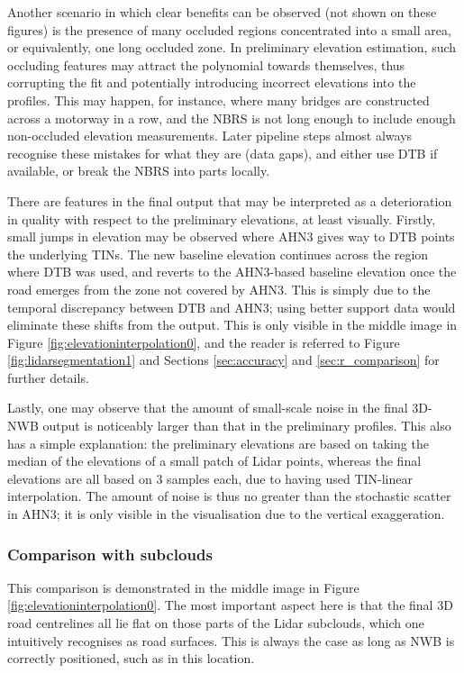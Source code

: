 Another scenario in which clear benefits can be observed (not shown on these figures) is the presence of many occluded regions concentrated into a small area, or equivalently, one long occluded zone. In preliminary elevation estimation, such occluding features may attract the polynomial towards themselves, thus corrupting the fit and potentially introducing incorrect elevations into the profiles. This may happen, for instance, where many bridges are constructed across a motorway in a row, and the NBRS is not long enough to include enough non-occluded elevation measurements. Later pipeline steps almost always recognise these mistakes for what they are (data gaps), and either use DTB if available, or break the NBRS into parts locally.

There are features in the final output that may be interpreted as a deterioration in quality with respect to the preliminary elevations, at least visually. Firstly, small jumps in elevation may be observed where AHN3 gives way to DTB points the underlying TINs. The new baseline elevation continues across the region where DTB was used, and reverts to the AHN3-based baseline elevation once the road emerges from the zone not covered by AHN3. This is simply due to the temporal discrepancy between DTB and AHN3; using better support data would eliminate these shifts from the output. This is only visible in the middle image in Figure \ref{fig:elevationinterpolation0}, and the reader is referred to Figure \ref{fig:lidarsegmentation1} and Sections \ref{sec:accuracy} and \ref{sec:r_comparison} for further details.

Lastly, one may observe that the amount of small-scale noise in the final 3D-NWB output is noticeably larger than that in the preliminary profiles. This also has a simple explanation: the preliminary elevations are based on taking the median of the elevations of a small patch of Lidar points, whereas the final elevations are all based on 3 samples each, due to having used TIN-linear interpolation. The amount of noise is thus no greater than the stochastic scatter in AHN3; it is only visible in the visualisation due to the vertical exaggeration.

\subsubsection{Comparison with subclouds}

This comparison is demonstrated in the middle image in Figure \ref{fig:elevationinterpolation0}. The most important aspect here is that the final 3D road centrelines all lie flat on those parts of the Lidar subclouds, which one intuitively recognises as road surfaces. This is always the case as long as NWB is correctly positioned, such as in this location.


